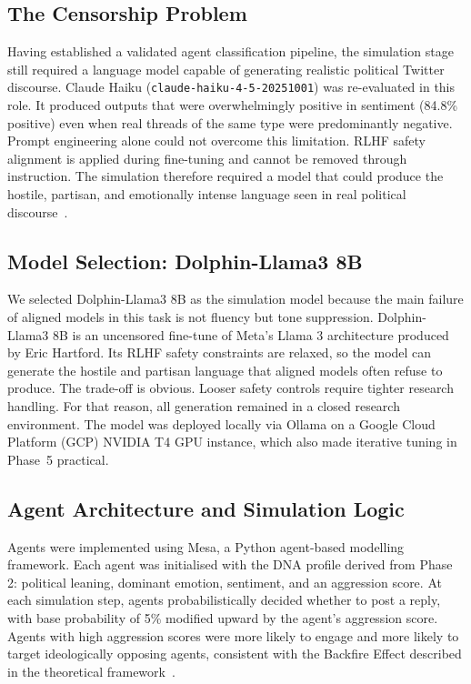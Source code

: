 \documentclass[logo,bsc,singlespacing,parskip,online]{infthesis}
\begin{document}
\subsection{The Censorship Problem}

Having established a validated agent classification pipeline, the simulation stage still required a language model capable of generating realistic political Twitter discourse. Claude Haiku (\texttt{claude-haiku-4-5-20251001}) was re-evaluated in this role. It produced outputs that were overwhelmingly positive in sentiment (84.8\% positive) even when real threads of the same type were predominantly negative. Prompt engineering alone could not overcome this limitation. RLHF safety alignment is applied during fine-tuning and cannot be removed through instruction. The simulation therefore required a model that could produce the hostile, partisan, and emotionally intense language seen in real political discourse~\citep{brady2017emotion,antypas2023negativity,tun2023sentiment}.

\subsection{Model Selection: Dolphin-Llama3 8B}

We selected Dolphin-Llama3 8B as the simulation model because the main failure of aligned models in this task is not fluency but tone suppression. Dolphin-Llama3 8B is an uncensored fine-tune of Meta's Llama 3 architecture produced by Eric Hartford. Its RLHF safety constraints are relaxed, so the model can generate the hostile and partisan language that aligned models often refuse to produce. The trade-off is obvious. Looser safety controls require tighter research handling. For that reason, all generation remained in a closed research environment. The model was deployed locally via Ollama on a Google Cloud Platform (GCP) NVIDIA T4 GPU instance, which also made iterative tuning in Phase~5 practical.

\subsection{Agent Architecture and Simulation Logic}

Agents were implemented using Mesa, a Python agent-based modelling framework. Each agent was initialised with the DNA profile derived from Phase 2: political leaning, dominant emotion, sentiment, and an aggression score. At each simulation step, agents probabilistically decided whether to post a reply, with base probability of 5\% modified upward by the agent's aggression score. Agents with high aggression scores were more likely to engage and more likely to target ideologically opposing agents, consistent with the Backfire Effect described in the theoretical framework~\citep{diehl2016political,brady2017emotion,composta2025simulating}.
\end{document}
